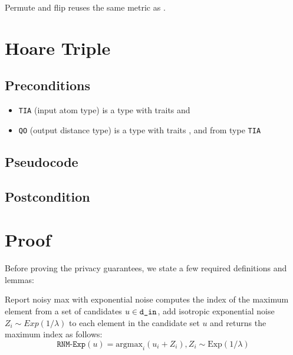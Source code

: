 \documentclass{article} %
\begin{document}
Permute and flip reuses the same metric as .

\section{Hoare Triple}
\subsection*{Preconditions}
\begin{itemize}
    \item \texttt{TIA} (input atom type) is a type with traits  and 
    \item \texttt{QO} (output distance type) is a type with traits , 
     and
     from type \texttt{TIA}
\end{itemize}

\subsection*{Pseudocode}
\label{sec:python-pseudocode}


\subsection*{Postcondition}

\section{Proof}

Before proving the privacy guarantees, we state a few required definitions and lemmas:
\begin{definition}
    \label{definition:rnm-exp}
 Report noisy max with exponential noise computes the index of the maximum element from a set of candidates $u \in \texttt{d\_in} $, add isotropic exponential noise $Z_i \sim Exp(1/\lambda)$ to each element in the candidate set $u$ and returns the maximum index as follows:
   \begin{equation}
    \texttt{RNM-Exp}(u) = \mathrm{argmax}_i(u_i + Z_i), Z_i \sim \mathrm{Exp}(1/\lambda)
   \end{equation} 
\end{definition}
\end{document}
